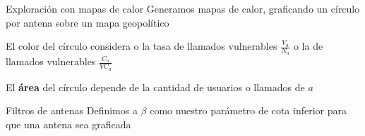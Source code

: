 \documentclass[xcolor=x11names]{beamer}
\begin{document}
\begin{frame}{Exploración con mapas de calor }
		Generamos mapas de calor, graficando un círculo por antena sobre un mapa geopolítico

		\medskip
		El color del círculo considera o la tasa de llamados vulnerables $\frac{V_a}{N_a}$ o la de llamados vulnerables $\frac{C_a}{VC_a}$

		\medskip
		El \textbf{\'area} del círculo depende de la cantidad de usuarios o llamados de $a$


	\begin{block}{Filtros de antenas}
		Definimos a $\beta$ como nuestro parámetro de cota inferior para que una antena sea graficada

		\medskip

	\end{block}
\end{frame}

\end{document}
